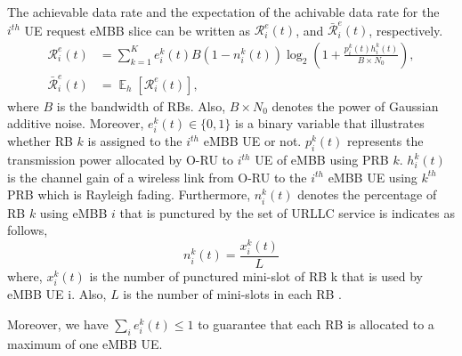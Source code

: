 \documentclass[conference]{IEEEtran}
\DeclareMathOperator{\E}{\mathbb{E}}
\begin{document}
The achievable data rate and the expectation of the achivable data rate for the $i^{th}$ UE request eMBB slice can be written as $\mathcal{R}_{i}^{e}(t)$, and $\bar{\mathcal{R}}_{i}^e(t)$, respectively.
\begin{equation}\label{eq1}
\begin{split}
\mathcal{R}_{i}^e(t) &= \sum_{k = 1}^K e^k_i(t) B (1-{n^k_i(t)}) \log_2({1+\frac{p^k_i(t)h^k_i(t)}{B \times N_0}}),\\
\bar{\mathcal{R}}_{i}^e(t) &= \E_{h}[\mathcal{R}_{i}^e(t)],
\end{split}
\end{equation}
where $B$ is the bandwidth of RBs. Also, $B\times N_0$ denotes the power of Gaussian additive noise. 
Moreover, $e^k_i(t)\in \{0,1\}$ is a binary variable that illustrates whether RB $k$ is assigned to the $i^{th}$ eMBB UE or not. 
$p^k_i(t)$ represents the transmission power allocated by O-RU to $i^{th}$ UE of eMBB using PRB $k$.
$h^k_i(t)$ is the channel gain of a wireless link from 
O-RU to the $i^{th}$ eMBB UE using $k^{th}$ PRB which is Rayleigh fading.
Furthermore, $n^k_i(t)$ denotes the percentage of RB $k$ using eMBB $i$ that is punctured by the set of URLLC service is indicates as follows,
\begin{equation}
n^k_i(t) = \frac{x^k_i(t)}{L}
\end{equation}
where, $x^k_i(t)$ is the number of punctured mini-slot of RB k that is used by eMBB UE i. Also, $L$ is the number of mini-slots in each RB \cite{alsenwi2021intelligent}.

Moreover, we have $\sum_i e_i^k(t)\le 1$ to guarantee that each RB is allocated to a maximum of one eMBB UE.
\end{document}
